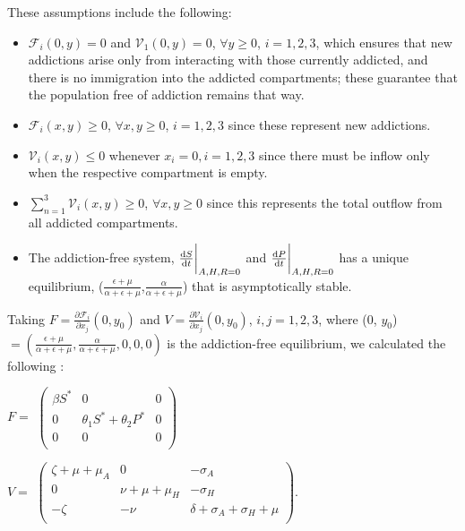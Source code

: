 \documentclass[12pt]{article}
\begin{document}
These assumptions include the following: 
\begin{itemize}
\item $\mathscr{F}_{i} (0,y)=0$ and $\mathscr{V}_{1}(0,y)=0$,  $\forall$$y \geq 0$, $i=1,2,3$, which ensures that new addictions arise only from interacting with those currently addicted, and there is no immigration into the addicted compartments; these guarantee that the population free of addiction remains that way. 
\item $\mathscr{F}_{i} (x,y) \geq 0$, $\forall$$x,y \geq 0$, $i=1,2,3$ since these represent new addictions. 
\item $\mathscr{V}_{i}(x,y) \leq 0$ whenever $x_i=0, i=1,2,3$ since there must be inflow only when the respective compartment is empty. 
\item $\sum_{n=1}^{3} \mathscr{V}_{i}(x,y) \geq 0$, $\forall x,y \geq 0$ since this represents the total outflow from all addicted compartments. 
\item The addiction-free system, $\dv{S}{t}\bigg|_{A,H,R=0}$ and $\dv{P}{t}\bigg|_{A,H,R=0}$ has a unique equilibrium, ($\frac{\epsilon+\mu}{\alpha+\epsilon+\mu}$,$\frac{\alpha}{\alpha+\epsilon+\mu}$) that is asymptotically stable. 
\end{itemize}

Taking $F=\frac{\partial \mathscr{F}_i}{\partial x_j} (0, y_0)$ and $V=\frac{\partial \mathscr{V}_i}{\partial x_j} (0, y_0)$, $i, j =1, 2, 3$, where (0, $y_{0}$) $=(\frac{\epsilon + \mu}{\alpha + \epsilon +\mu},\frac{\alpha}{\alpha + \epsilon +\mu},0,0,0)$ is the addiction-free equilibrium, we calculated the following \cite{Driessche}: 



\begin{center}
$F=$
$ \begin{pmatrix}

\beta S^* &  0  & 0 \\
0 & \theta_1 S^* +\theta_2 P^* & 0\\
0  &   0 & 0\\
\end{pmatrix}$



$V=$
$ \begin{pmatrix}

\zeta +\mu +\mu_A &  0  & -\sigma_A \\
0 &  \nu+\mu+\mu_H & -\sigma_H\\
-\zeta& -\nu  & \delta + \sigma_A + \sigma_H + \mu\\

\end{pmatrix}$.
\end{center}
\end{document}
